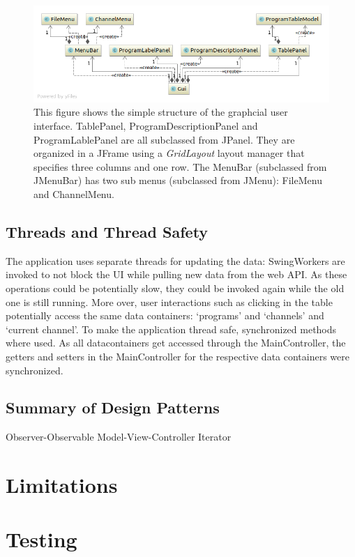 \documentclass[a4paper,11pt,twoside]{article}
\begin{document}
\begin{figure}[p]
  \centering
  \includegraphics[width=1\textwidth]{guiUML.png}
  \caption{This figure shows the simple structure of the graphcial user interface. TablePanel, ProgramDescriptionPanel and ProgramLablePanel are all subclassed from JPanel. They are organized in a JFrame using a \textit{GridLayout} layout manager that specifies three columns and one row. The MenuBar (subclassed from JMenuBar) has two sub menus (subclassed from JMenu): FileMenu and ChannelMenu.}
  \label{fig:gui}
\end{figure}



\subsection{Threads and Thread Safety}
The application uses separate threads for updating the data: SwingWorkers are invoked to not block the UI while pulling new data from the web API. As these operations could be potentially slow, they could be invoked again while the old one is still running. More over, user interactions such as clicking in the table potentially access the same data containers: `programs' and `channels' and `current channel'.
To make the application thread safe, synchronized methods where used. As all datacontainers get accessed through the MainController, the getters and setters in the MainController for the respective data containers were synchronized. 


\subsection{Summary of Design Patterns}
Observer-Observable
Model-View-Controller
Iterator


\section{Limitations}

\section{Testing}



\end{document}
